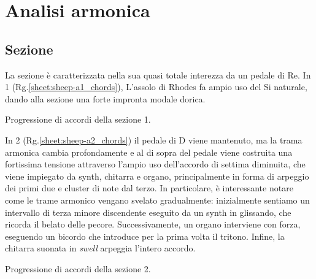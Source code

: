 \documentclass[class=book, crop=false, oneside, 12pt]{standalone}
\begin{document}

    \section{Analisi armonica}
    \label{sec:04-harmony}

    \subsection{Sezione }
    La sezione  è caratterizzata nella sua quasi totale interezza da un pedale di Re. In 1 (Rg.\ref{sheet:sheep-a1_chords}), L'assolo di Rhodes fa ampio uso del Si naturale, dando alla sezione una forte impronta modale dorica.     
    
    \begin{sheet}[htb]
        \centering
        \caption{Progressione di accordi della sezione 1.}
        \label{sheet:sheep-a1_chords}
    \end{sheet}

    In 2 (Rg.\ref{sheet:sheep-a2_chords}) il pedale di D viene mantenuto, ma la trama armonica cambia profondamente e al di sopra del pedale viene costruita una fortissima tensione attraverso l'ampio uso dell'accordo di settima diminuita, che viene impiegato da synth, chitarra e organo, principalmente in forma di arpeggio dei primi due e cluster di note dal terzo. In particolare, è interessante notare come le trame armonico vengano svelato gradualmente: inizialmente sentiamo un intervallo di terza minore discendente eseguito da un synth in glissando, che ricorda il belato delle pecore.
    Successivamente, un organo interviene con forza, eseguendo un bicordo che introduce per la prima volta il tritono. Infine, la chitarra suonata in \emph{swell} arpeggia l'intero accordo. 
    
    \begin{sheet}[htb]
        \centering
        \caption{Progressione di accordi della sezione 2.}
        \label{sheet:sheep-a2_chords}
    \end{sheet}
\end{document}
